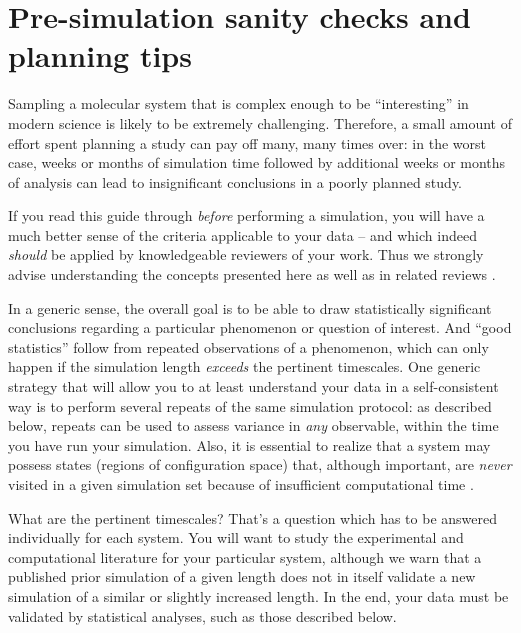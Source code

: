 \section{Pre-simulation sanity checks and planning tips}
\label{sec:sanity}

Sampling a molecular system that is complex enough to be ``interesting'' in modern science is likely to be extremely challenging.
Therefore, a small amount of effort spent planning a study can pay off many, many times over: in the worst case, weeks or months of simulation time followed by additional weeks or months of analysis can lead to insignificant conclusions in a poorly planned study.

If you read this guide through \emph{before} performing a simulation, you will have a much better sense of the criteria applicable to your data -- and which indeed \emph{should} be applied by knowledgeable reviewers of your work.
Thus we strongly advise understanding the concepts presented here as well as in related reviews \cite{Grossfield2009,JCGM:GUM2008}.

In a generic sense, the overall goal is to be able to draw statistically significant conclusions regarding a particular phenomenon or question of interest.
And ``good statistics'' follow from repeated observations of a phenomenon, which can only happen if the simulation length \emph{exceeds} the pertinent timescales.
One generic strategy that will allow you to at least understand your data in a self-consistent way is to perform several repeats of the same simulation protocol: as described below, repeats can be used to assess variance in \emph{any} observable, within the time you have run your simulation.
Also, it is essential to realize that a system may possess states (regions of configuration space) that, although important, are \emph{never} visited in a given simulation set because of insufficient computational time \cite{Grossfield2009}.

What are the pertinent timescales?
That's a question which has to be answered individually for each system.
You will want to study the experimental and computational literature for your particular system, although we warn that a published prior simulation of a given length does not in itself validate a new simulation of a similar or slightly increased length.
In the end, your data must be validated by statistical analyses, such as those described below.

